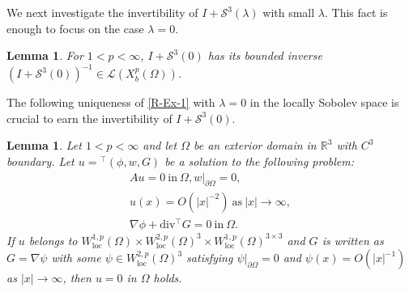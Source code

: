 \documentclass[dvipdfmx,12pt]{article}
\newtheorem{lem}[dfn]{Lemma}
\begin{document}
We next investigate the invertibility of $I+\mathcal{S}^3(\lambda)$ with small $\lambda$. This fact is enough to focus on the case $\lambda=0$. 
\begin{lem}\label{R-Ex-lem1}
For $1<p<\infty$, $I+\mathcal{S}^3(0)$ has its bounded inverse $(I+\mathcal{S}^3(0))^{-1}\in \mathcal{L}(X_b^p(\Omega))$.
\end{lem}
The following uniqueness of \eqref{R-Ex-1} with $\lambda=0$ in the locally Sobolev space is crucial to earn the invertibility of $I+\mathcal{S}^3(0)$.
\begin{lem}\label{R-Ex-lem2}
Let $1<p<\infty$ and let $\Omega$ be an exterior domain in $\mathbb{R}^3$ with $C^3$ boundary. Let $u={}^\top(\phi,w,G)$ be a solution to the following problem:
\begin{gather}
Au=0~\mathrm{in}~\Omega, w|_{\partial \Omega}=0, \label{R-Ex-lem2-1} \\
 u(x)=O(|x|^{-2})~\mathrm{as}~|x|\to\infty, \label{R-Ex-lem2-2} \\
\nabla\phi+\mathrm{div} {}^\top G=0 ~\mathrm{in}~\Omega. \label{R-Ex-lem2-3}
\end{gather}
If $u$ belongs to $W_{\mathrm{loc}}^{1,p}(\Omega)\times W_{\mathrm{loc}}^{2,p}(\Omega)^3 \times W_{\mathrm{loc}}^{1,p}(\Omega)^{3\times3}$ and $G$ is written as $G=\nabla\psi$ with some $\psi\in W_{\mathrm{loc}}^{2,p}(\Omega)^3$ satisfying $\psi|_{\partial \Omega}=0$ and $\psi(x)=O(|x|^{-1})$ as $|x|\to\infty$, then $u=0$ in $\Omega$ holds.
\end{lem}
\end{document}
